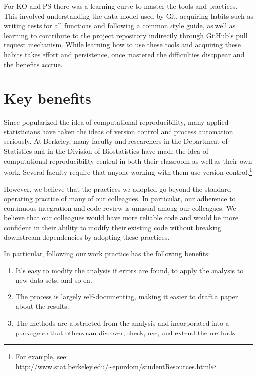 \documentclass[]{article}
\begin{document}
For KO and PS there was a learning curve to master the tools and practices.
This involved understanding the data model used by Git, acquiring habits such
as writing tests for all functions and following a common style guide, as well
as learning to contribute to the project repository indirectly through GitHub's
pull request mechanism.
While learning how to use these tools and acquiring these habits takes effort
and persistence, once mastered the difficulties disappear and the benefits
accrue.

\section{Key benefits}\label{key-benefits}


Since \cite{buckheit1995wavelab} popularized the idea of computational
reproducibility, many applied statisticians have taken the ideas of version
control and process automation seriously.
At Berkeley, many faculty and researchers in the Department of Statistics and
in the Division of Biostatistics have made the idea of computational
reproducibility central in both their classroom as well as their own work.
Several faculty require that anyone working with them use version
control.\footnote{For example, see:
\url{http://www.stat.berkeley.edu/~epurdom/studentResources.html}}

However, we believe that the practices we adopted go beyond the standard
operating practice of many of our colleagues.
In particular, our adherence to continuous integration and code review is
unusual among our colleagues.
We believe that our colleagues would have more reliable code and would be more
confident in their ability to modify their existing code without breaking
downstream dependencies by adopting these practices.

In particular, following our work practice has the following benefits:
\begin{enumerate}
\item It's easy to modify the analysis if errors are found, to apply the
  analysis to new data sets, and so on.
\item The process is largely self-documenting, making it easier to draft a
  paper about the results.
\item The methods are abstracted from the analysis and incorporated into a
  package so that others can discover, check, use, and extend the methods.
\end{enumerate}
\end{document}
